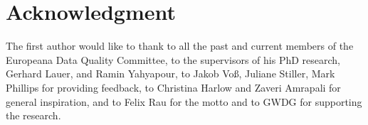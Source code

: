 \section*{Acknowledgment}
The first author would like to thank to all the past and current members of the Europeana Data Quality Committee, to the supervisors of his PhD research, Gerhard Lauer, and Ramin Yahyapour, to Jakob Voß, Juliane Stiller, Mark Phillips for providing feedback, to Christina Harlow and Zaveri Amrapali for general inspiration, and to Felix Rau for the motto and to GWDG for supporting the research.

% 
% 
